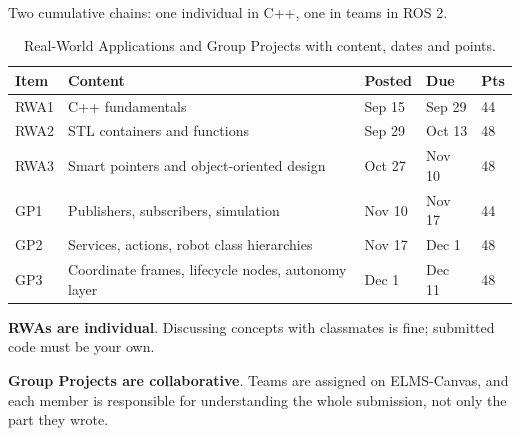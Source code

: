 \documentclass[
    10pt,
    dvipsnames,
    svgnames,
    x11names,
    aspectratio=1610,
    english,
    codeminted]{beamer}
\begin{document}
\begin{frame}[fragile]{\secname}
\framesubtitle{\subsecname}
Two cumulative chains: one individual in C++, one in teams in ROS 2.

\begin{table}[h]
\caption{Real-World Applications and Group Projects with content, dates and points.}
\scriptsize\centering
\renewcommand{\arraystretch}{1.2}
\begin{tabular}{m{1cm}m{4.6cm}m{1.5cm}m{1.5cm}m{0.9cm}}
  \toprule
  \textbf{Item} & \textbf{Content} & \textbf{Posted} & \textbf{Due} & \textbf{Pts} \\
  \midrule
  RWA1 & C++ fundamentals                          & Sep 15 & Sep 29 & 44 \\
  RWA2 & STL containers and functions              & Sep 29 & Oct 13 & 48 \\
  RWA3 & Smart pointers and object-oriented design & Oct 27 & Nov 10 & 48 \\
  \midrule
  GP1  & Publishers, subscribers, simulation       & Nov 10 & Nov 17 & 44 \\
  GP2  & Services, actions, robot class hierarchies & Nov 17 & Dec 1 & 48 \\
  GP3  & Coordinate frames, lifecycle nodes, autonomy layer & Dec 1 & Dec 11 & 48 \\
  \bottomrule
\end{tabular}
\end{table}

\begin{compactitem}
\small
    \item \textbf{RWAs are individual}. Discussing concepts with classmates is fine; submitted code must be your own.
    \item \textbf{Group Projects are collaborative}. Teams are assigned on ELMS-Canvas, and each member is responsible for understanding the whole submission, not only the part they wrote.
\end{compactitem}
\end{frame}
\end{document}
